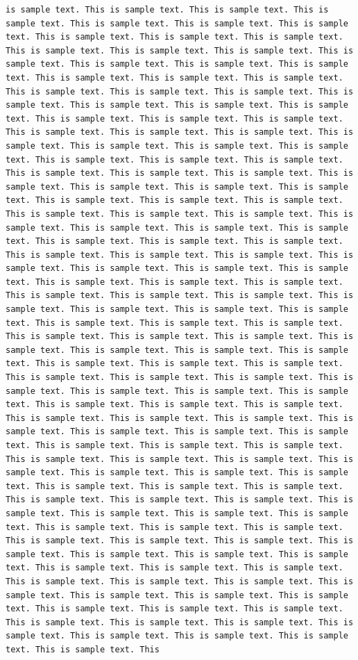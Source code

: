 \documentclass[11pt,a4paper]{article}
\begin{document}
\begin{verbatim}
is sample text. This is sample text. This is sample text. This is sample text. This is sample text. This is sample text. This is sample text. This is sample text. This is sample text. This is sample text. This is sample text. This is sample text. This is sample text. This is sample text. This is sample text. This is sample text. This is sample text. This is sample text. This is sample text. This is sample text. This is sample text. This is sample text. This is sample text. This is sample text. This is sample text. This is sample text. This is sample text. This is sample text. This is sample text. This is sample text. This is sample text. This is sample text. This is sample text. This is sample text. This is sample text. This is sample text. This is sample text. This is sample text. This is sample text. This is sample text. This is sample text. This is sample text. This is sample text. This is sample text. This is sample text. This is sample text. This is sample text. This is sample text. This is sample text. This is sample text. This is sample text. This is sample text. This is sample text. This is sample text. This is sample text. This is sample text. This is sample text. This is sample text. This is sample text. This is sample text. This is sample text. This is sample text. This is sample text. This is sample text. This is sample text. This is sample text. This is sample text. This is sample text. This is sample text. This is sample text. This is sample text. This is sample text. This is sample text. This is sample text. This is sample text. This is sample text. This is sample text. This is sample text. This is sample text. This is sample text. This is sample text. This is sample text. This is sample text. This is sample text. This is sample text. This is sample text. This is sample text. This is sample text. This is sample text. This is sample text. This is sample text. This is sample text. This is sample text. This is sample text. This is sample text. This is sample text. This is sample text. This is sample text. This is sample text. This is sample text. This is sample text. This is sample text. This is sample text. This is sample text. This is sample text. This is sample text. This is sample text. This is sample text. This is sample text. This is sample text. This is sample text. This is sample text. This is sample text. This is sample text. This is sample text. This is sample text. This is sample text. This is sample text. This is sample text. This is sample text. This is sample text. This is sample text. This is sample text. This is sample text. This is sample text. This is sample text. This is sample text. This is sample text. This is sample text. This is sample text. This is sample text. This is sample text. This is sample text. This is sample text. This is sample text. This is sample text. This is sample text. This is sample text. This is sample text. This is sample text. This is sample text. This is sample text. This is sample text. This is sample text. This is sample text. This is sample text. This is sample text. This is sample text. This is sample text. This is sample text. This is sample text. This is sample text. This is sample text. This is sample text. This is sample text. This is sample text. This is sample text. This is sample text. This 
\end{verbatim}
\end{document}
